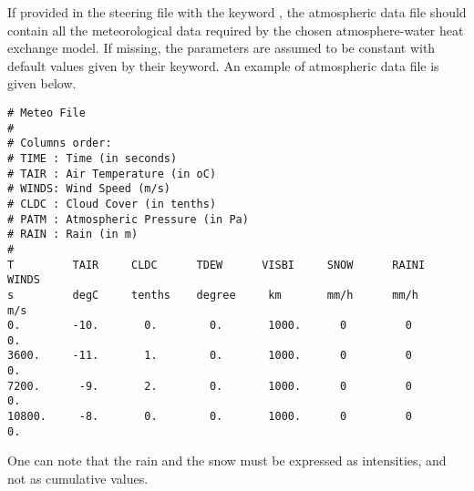 If provided in the  steering file with the keyword ,
the atmospheric data file should contain all the meteorological data required by the chosen
atmosphere-water heat exchange model.
If missing, the parameters are assumed to be constant with default values given by their keyword.
An example of atmospheric data file is given below.

\lstset{language=TelemacCas,
        basicstyle=\scriptsize\ttfamily}
\begin{lstlisting}
# Meteo File
#
# Columns order:
# TIME : Time (in seconds)
# TAIR : Air Temperature (in oC)
# WINDS: Wind Speed (m/s)
# CLDC : Cloud Cover (in tenths)
# PATM : Atmospheric Pressure (in Pa)
# RAIN : Rain (in m)
#
T         TAIR     CLDC      TDEW      VISBI     SNOW      RAINI     WINDS
s         degC     tenths    degree     km       mm/h      mm/h      m/s
0.        -10.       0.        0.       1000.      0         0         0.
3600.     -11.       1.        0.       1000.      0         0         0.
7200.      -9.       2.        0.       1000.      0         0         0.
10800.     -8.       0.        0.       1000.      0         0         0.
\end{lstlisting}

One can note that the rain and the snow must be expressed as intensities,
and not as cumulative values.


\clearpage
